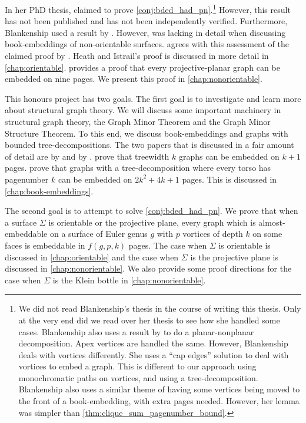 In her PhD thesis, \textcite{Blankenship-PhD03} claimed to prove \cref{conj:bded_had_pn}.\footnote{
	We did not read Blankenship's thesis in the course of writing this thesis. Only at the very end did we read over her thesis to see how she handled some cases. 
	Blankenship also uses a result by \textcite{heathPagenumberGenusGraphs1992} to do a planar-nonplanar decomposition. Apex vertices are handled the same. However, Blankenship deals with vortices differently. She uses a ``cap edges'' solution to deal with vortices to embed a graph. This is different to our approach using monochromatic paths on vortices, and using a tree-decomposition. 
	Blankenship also uses a similar theme of having some vertices being moved to the front of a book-embedding, with extra pages needed. However, her lemma was simpler than \cref{thm:clique_sum_pagenumber_bound}. 
}
However, this result has not been published and has not been independently verified. Furthermore, Blankenship used a result by \textcite{heathPagenumberGenusGraphs1992}. However, was lacking in detail when discussing book-embeddings of non-orientable surfaces. \textcite{nakamotoBookEmbeddingProjectiveplanar2015} agrees with this assessment of the claimed proof by \textcite{heathPagenumberGenusGraphs1992}. Heath and Istrail's proof is discussed in more detail in \cref{chap:orientable}. \textcite{nakamotoBookEmbeddingProjectiveplanar2015} provides a proof that every projective-planar graph can be embedded on nine pages. We present this proof in \cref{chap:nonorientable}. 

This honours project has two goals. The first goal is to investigate and learn more about structural graph theory. We will discuss some important machinery in structural graph theory, the Graph Minor Theorem and the Graph Minor Structure Theorem. To this end, we discuss book-embeddings and graphs with bounded tree-decompositions. The two papers that is discussed in a fair amount of detail are by \textcite{hickingbothamStackNumberCliqueSum2023} and by \textcite{ganleyPagenumberTrees2001}. \textcite{ganleyPagenumberTrees2001} prove that treewidth $k$ graphs can be embedded on $k+1$ pages. \textcite{hickingbothamStackNumberCliqueSum2023} prove that graphs with a tree-decomposition where every torso has pagenumber $k$ can be embedded on $2k^2 + 4k + 1$ pages. This is discussed in \cref{chap:book-embeddings}.

The second goal is to attempt to solve \cref{conj:bded_had_pn}. We prove that when a surface $\Sigma$ is orientable or the projective plane, every graph which is almost-embeddable on a surface of Euler genus $g$ with $p$ vortices of depth $k$ on some faces is embeddable in $f(g, p, k)$ pages. The case when $\Sigma$ is orientable is discussed in \cref{chap:orientable} and the case when $\Sigma$ is the projective plane is discussed in \cref{chap:nonorientable}. We also provide some proof directions for the case when $\Sigma$ is the Klein bottle in \cref{chap:nonorientable}. 

